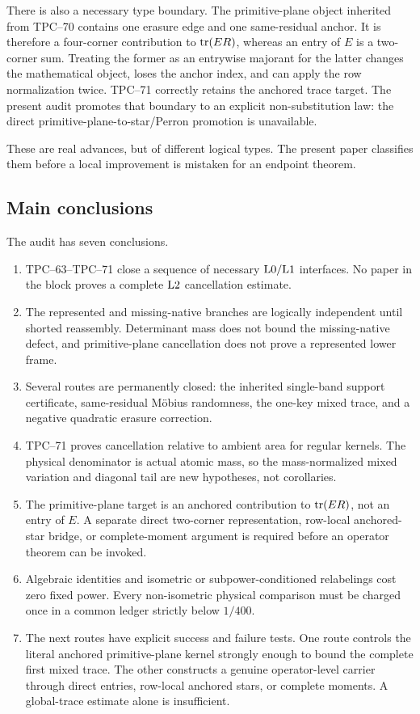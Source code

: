There is also a necessary type boundary.  The primitive-plane object inherited
from TPC--70 contains one erasure edge and one same-residual anchor.  It is
therefore a four-corner contribution to \(\operatorname{tr}(ER)\), whereas an entry of
\(E\) is a two-corner sum.  Treating the former as an entrywise majorant for
the latter changes the mathematical object, loses the anchor index, and
can apply the row normalization twice.  TPC--71 correctly retains the
anchored trace target.  The present audit promotes that boundary to an
explicit non-substitution law: the direct primitive-plane-to-star/Perron
promotion is unavailable.

These are real advances, but of different logical types.  The present paper
classifies them before a local improvement is mistaken for an endpoint
theorem.

\subsection{Main conclusions}

The audit has seven conclusions.
\begin{enumerate}[label=\textup{(\arabic*)},leftmargin=3em]
 \item TPC--63--TPC--71 close a sequence of necessary \(\mathrm{L0}/\mathrm{L1}\)
       interfaces.  No paper in the block proves a complete \(\mathrm{L2}\)
       cancellation estimate.
 \item The represented and missing-native branches are logically
       independent until shorted reassembly.  Determinant mass does not
       bound the missing-native defect, and primitive-plane cancellation
       does not prove a represented lower frame.
 \item Several routes are permanently closed: the inherited single-band
       support certificate, same-residual M\"obius randomness, the one-key
       mixed trace, and a negative quadratic erasure correction.
 \item TPC--71 proves cancellation relative to ambient area for regular
       kernels.  The physical denominator is actual atomic mass, so the
       mass-normalized mixed variation and diagonal tail are new
       hypotheses, not corollaries.
 \item The primitive-plane target is an anchored contribution to
       \(\operatorname{tr}(ER)\), not an entry of \(E\).  A separate direct two-corner
       representation, row-local anchored-star bridge, or complete-moment
       argument is required before an operator theorem can be invoked.
 \item Algebraic identities and isometric or subpower-conditioned
       relabelings cost zero fixed power.  Every non-isometric physical
       comparison must be charged once in a common ledger strictly below
       \(1/400\).
 \item The next routes have explicit success and failure tests.  One route
       controls the literal anchored primitive-plane kernel strongly enough
       to bound the complete first mixed trace.  The other constructs a
       genuine operator-level carrier through direct entries, row-local
       anchored stars, or complete moments.  A global-trace estimate alone
       is insufficient.
\end{enumerate}

